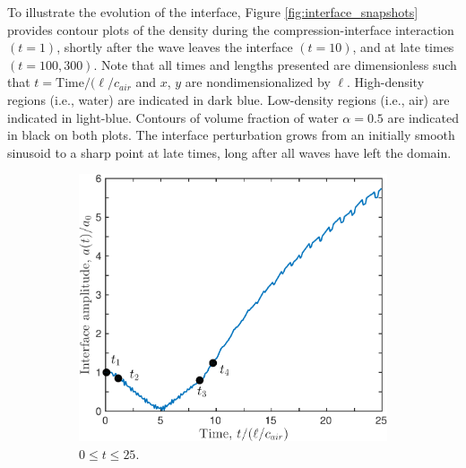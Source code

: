 % 
To illustrate the evolution of the interface, Figure
\ref{fig:interface_snapshots} provides contour plots of the density
during the compression-interface interaction $(t=1)$, shortly after
the wave leaves the interface $(t=10)$, and at late times
$(t=100, 300)$. Note that all times and lengths presented are
dimensionless such that $t = \text{Time}/(\ell/c_{air}$ and $x$,
$y$ are nondimensionalized by $\ell$. High-density regions (i.e.,
water) are indicated in dark blue. Low-density regions (i.e., air) are
indicated in light-blue. Contours of volume fraction of water
$\alpha=0.5$ are indicated in black on both plots. The interface
perturbation grows from an initially smooth sinusoid to a sharp point
at late times, long after all waves have left the domain.
% 
\begin{figure}[h] 
  \centering
  \begin{subfigure}[b]{0.45\textwidth}
    \centering
    \includegraphics[width=\textwidth]{./figs/lung_figs/trapz10_intf_schematic}
    \caption{\label{fig:trapz10_interface25} $0\leq t \leq 25$.}
  \end{subfigure}
  ~
  \begin{subfigure}[b]{0.45\textwidth}
    \centering

\end{subfigure}
\end{figure}
